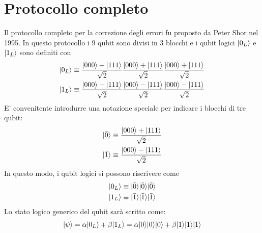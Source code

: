 \documentclass[12pt, a4paper]{report}
\begin{document}
\section{Protocollo completo}
Il protocollo completo per la correzione degli errori fu proposto da Peter Shor nel 1995. In questo protocollo i 9 qubit sono divisi in 3 blocchi e i qubit logici $| 0_{L} \rangle$ e $| 1_{L} \rangle$ sono definiti con
\begin{equation*}
    \begin{split}
        | 0_{L} \rangle &\equiv \frac{| 000 \rangle+| 111 \rangle}{\sqrt{2}} \frac{| 000 \rangle+| 111 \rangle}{\sqrt{2}}\frac{| 000 \rangle+| 111 \rangle}{\sqrt{2}} \\
        | 1_{L} \rangle &\equiv \frac{| 000 \rangle-| 111 \rangle}{\sqrt{2}} \frac{| 000 \rangle-| 111 \rangle}{\sqrt{2}}\frac{| 000 \rangle-| 111 \rangle}{\sqrt{2}}
    \end{split}
\end{equation*}
E' convenitente introdurre una notazione speciale per indicare i blocchi di tre qubit:
\begin{equation*}
    \begin{split}
        | \bar{0} \rangle &\equiv \frac{| 000 \rangle+| 111 \rangle}{\sqrt{2}} \\
        | \bar{1} \rangle &\equiv \frac{| 000 \rangle-| 111 \rangle}{\sqrt{2}}
    \end{split}
\end{equation*}
In questo modo, i qubit logici si possono riscrivere come
\begin{equation*}
    \begin{split}
        | 0_{L} \rangle &\equiv | \bar{0} \rangle| \bar{0} \rangle| \bar{0} \rangle \\
        | 1_{L} \rangle &\equiv | \bar{1} \rangle| \bar{1} \rangle| \bar{1} \rangle
    \end{split}
\end{equation*}
Lo stato logico generico del qubit sarà scritto come:
\begin{equation*}
    | \psi \rangle = \alpha| 0_{L} \rangle+\beta| 1_{L} \rangle = \alpha| \bar{0} \rangle| \bar{0} \rangle| \bar{0} \rangle + \beta| \bar{1} \rangle| \bar{1} \rangle| \bar{1} \rangle
\end{equation*}
\end{document}
